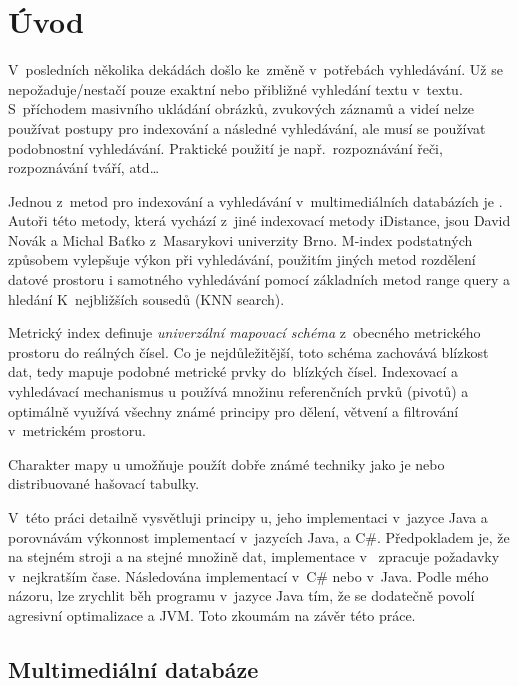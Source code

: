 \chapter{Úvod}

V~posledních několika dekádách došlo ke~změně v~potřebách vyhledávání.
Už se nepožaduje/nestačí pouze exaktní nebo přibližné vyhledání textu
v~textu. S~příchodem masivního ukládání obrázků, zvukových záznamů
a videí nelze používat  postupy pro indexování a následné
vyhledávání, ale musí se používat podobnostní vyhledávání. Praktické
použití je např.~rozpoznávání řeči, rozpoznávání tváří, atd\ldots{}

Jednou z~metod pro indexování a vyhledávání v~multimediálních databázích
je \MIndex\cite{Novak:2009:MIE:1637863.1638184}\@. Autoři této
metody, která vychází z~jiné indexovací metody iDistance\cite{Jagadish:2005:IAB:1071610.1071612},
jsou David Novák a Michal Baťko z~Masarykovi univerzity Brno\@.
M-index podstatných způsobem vylepšuje výkon při vyhledávání, použitím
jiných metod rozdělení datové prostoru i samotného vyhledávání pomocí
základních metod range query a hledání K~nejbližších sousedů (KNN
search)\@.

Metrický index definuje \emph{univerzální mapovací schéma} z~obecného
metrického prostoru do reálných čísel\@. Co je nejdůležitější, toto
schéma zachovává blízkost dat, tedy mapuje podobné metrické prvky
do~blízkých čísel\@. Indexovací a vyhledávací mechanismus \MIndex
u používá množinu referenčních prvků (pivotů) a optimálně využívá všechny
známé principy pro dělení, větvení a filtrování v~metrickém prostoru\@.

Charakter mapy \MIndex u umožňuje použít dobře známé techniky jako
je \BPTree\cite{Cormen:2001:IA:580470} nebo distribuované
hašovací tabulky\@.

V~této práci detailně vysvětluji principy \MIndex u, jeho implementaci
v~jazyce Java a porovnávám výkonnost implementací \MIndex{} v~jazycích
Java, \CC{} a C\#. Předpokladem je, že na stejném stroji a na stejné
množině dat, implementace v~\CC{} zpracuje požadavky v~nejkratším
čase. Následována implementací v~C\# nebo v~Java. Podle mého názoru,
lze zrychlit běh programu v~jazyce Java tím, že se dodatečně povolí
agresivní optimalizace a  JVM. Toto zkoumám na závěr této práce.

\section{Multimediální databáze}


